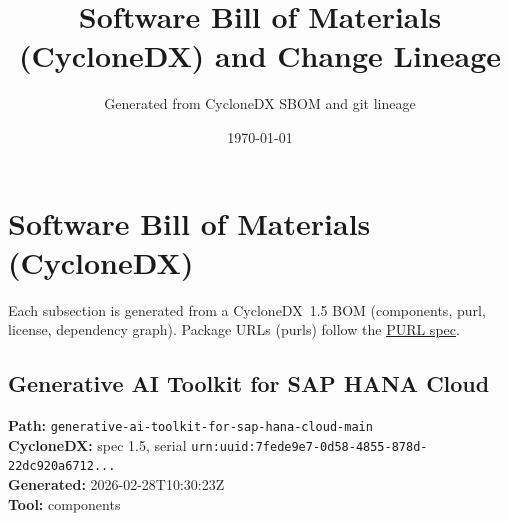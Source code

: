 \documentclass[11pt,a4paper]{article}
\title{\textbf{Software Bill of Materials (CycloneDX) and Change Lineage}}
\author{Generated from CycloneDX SBOM and git lineage}
\date{\today}
\begin{document}
\maketitle
\tableofcontents
\newpage
\section{Software Bill of Materials (CycloneDX)}
Each subsection is generated from a CycloneDX~1.5 BOM (components, purl, license, dependency graph). Package URLs (purls) follow the \href{https://github.com/package-url/purl-spec}{PURL spec}.

\subsection{Generative AI Toolkit for SAP HANA Cloud}
\textbf{Path:} \texttt{generative-ai-toolkit-for-sap-hana-cloud-main}
\\ \textbf{CycloneDX:} spec 1.5, serial \texttt{urn:uuid:7fede9e7-0d58-4855-878d-22dc920a6712...}
\\ \textbf{Generated:} 2026-02-28T10:30:23Z
\\ \textbf{Tool:} components
\end{document}

